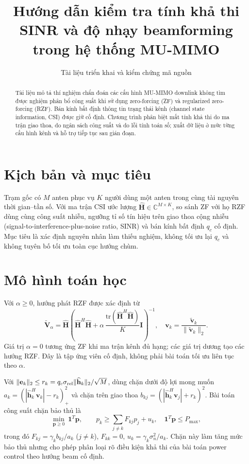 \documentclass[11pt,onecolumn]{IEEEtran}
\title{Hướng dẫn kiểm tra tính khả thi SINR và độ nhạy beamforming trong hệ thống MU-MIMO}
\author{Tài liệu triển khai và kiểm chứng mã nguồn}
\begin{document}
\maketitle
\begin{abstract}
Tài liệu mô tả thí nghiệm chẩn đoán các cấu hình MU-MIMO downlink không tìm được nghiệm phân bổ công suất khi sử dụng zero-forcing (ZF) và regularized zero-forcing (RZF). Bán kính bất định thông tin trạng thái kênh (channel state information, CSI) được giữ cố định. Chương trình phân biệt mất tính khả thi do ma trận giao thoa, do ngân sách công suất và do lỗi tính toán số; xuất dữ liệu ở mức từng cấu hình kênh và hỗ trợ tiếp tục sau gián đoạn.
\end{abstract}
\section{Kịch bản và mục tiêu}
Trạm gốc có $M$ anten phục vụ $K$ người dùng một anten trong cùng tài nguyên thời gian--tần số. Với ma trận CSI ước lượng $\widehat{\mathbf H}\in\mathbb C^{M\times K}$, so sánh ZF với họ RZF dùng cùng công suất nhiễu, ngưỡng tỉ số tín hiệu trên giao thoa cộng nhiễu (signal-to-interference-plus-noise ratio, SINR) và bán kính bất định $q_c$ cố định. Mục tiêu là xác định nguyên nhân làm thiếu nghiệm, không tối ưu lại $q_c$ và không tuyên bố tối ưu toàn cục hướng chùm.
\section{Mô hình toán học}
Với $\alpha\geq0$, hướng phát RZF được xác định từ
\begin{equation}
\widetilde{\mathbf V}_{\alpha}=\widehat{\mathbf H}\left(\widehat{\mathbf H}^{H}\widehat{\mathbf H}+\alpha\,\frac{\mathrm{tr}(\widehat{\mathbf H}^{H}\widehat{\mathbf H})}{K}\mathbf I\right)^{-1},\quad
\mathbf v_k=\frac{\widetilde{\mathbf v}_k}{\|\widetilde{\mathbf v}_k\|_2}.
\end{equation}
Giá trị $\alpha=0$ tương ứng ZF khi ma trận kênh đủ hạng; các giá trị dương tạo các hướng RZF. Đây là tập ứng viên cố định, không phải bài toán tối ưu liên tục theo $\alpha$.

Với $\|\mathbf e_k\|_2\leq r_k=q_c\sigma_{\rm rel}\|\widehat{\mathbf h}_k\|_2/\sqrt M$, dùng chặn dưới độ lợi mong muốn $a_k=(|\widehat{\mathbf h}_k^H\mathbf v_k|-r_k)_+^2$ và chặn trên giao thoa $b_{kj}=(|\widehat{\mathbf h}_k^H\mathbf v_j|+r_k)^2$. Bài toán công suất chặn bảo thủ là
\begin{equation}
\min_{\mathbf p\geq0}\ \mathbf1^T\mathbf p,\qquad
p_k\geq\sum_{j\ne k}F_{kj}p_j+u_k,\quad \mathbf1^T\mathbf p\leq P_{\max},
\end{equation}
trong đó $F_{kj}=\gamma_k b_{kj}/a_k$ ($j\ne k$), $F_{kk}=0$, $u_k=\gamma_k\sigma_n^2/a_k$. Chặn này làm tăng mức bảo thủ nhưng cho phép phân loại rõ điều kiện khả thi của bài toán power control theo hướng beam cố định.
\end{document}
